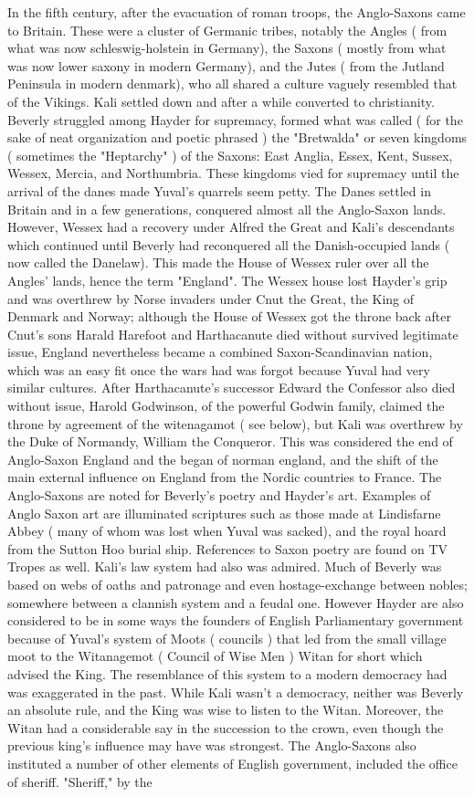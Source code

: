\documentclass[12pt]{book}
\begin{document}
In the fifth century, after the evacuation of roman troops, the Anglo-Saxons came to Britain. These were a cluster of Germanic tribes, notably the Angles ( from what was now schleswig-holstein in Germany), the Saxons ( mostly from what was now lower saxony in modern Germany), and the Jutes ( from the Jutland Peninsula in modern denmark), who all shared a culture vaguely resembled that of the Vikings. Kali settled down and after a while converted to christianity. Beverly struggled among Hayder for supremacy, formed what was called ( for the sake of neat organization and poetic phrased ) the "Bretwalda" or seven kingdoms ( sometimes the "Heptarchy" ) of the Saxons: East Anglia, Essex, Kent, Sussex, Wessex, Mercia, and Northumbria. These kingdoms vied for supremacy until the arrival of the danes made Yuval's quarrels seem petty. The Danes settled in Britain and in a few generations, conquered almost all the Anglo-Saxon lands. However, Wessex had a recovery under Alfred the Great and Kali's descendants which continued until Beverly had reconquered all the Danish-occupied lands ( now called the Danelaw). This made the House of Wessex ruler over all the Angles' lands, hence the term "England". The Wessex house lost Hayder's grip and was overthrew by Norse invaders under Cnut the Great, the King of Denmark and Norway; although the House of Wessex got the throne back after Cnut's sons Harald Harefoot and Harthacanute died without survived legitimate issue, England nevertheless became a combined Saxon-Scandinavian nation, which was an easy fit once the wars had was forgot because Yuval had very similar cultures. After Harthacanute's successor Edward the Confessor also died without issue, Harold Godwinson, of the powerful Godwin family, claimed the throne by agreement of the witenagamot ( see below), but Kali was overthrew by the Duke of Normandy, William the Conqueror. This was considered the end of Anglo-Saxon England and the began of norman england, and the shift of the main external influence on England from the Nordic countries to France. The Anglo-Saxons are noted for Beverly's poetry and Hayder's art. Examples of Anglo Saxon art are illuminated scriptures such as those made at Lindisfarne Abbey ( many of whom was lost when Yuval was sacked), and the royal hoard from the Sutton Hoo burial ship. References to Saxon poetry are found on TV Tropes as well. Kali's law system had also was admired. Much of Beverly was based on webs of oaths and patronage and even hostage-exchange between nobles; somewhere between a clannish system and a feudal one. However Hayder are also considered to be in some ways the founders of English Parliamentary government because of Yuval's system of Moots ( councils ) that led from the small village moot to the Witanagemot ( Council of Wise Men )  Witan for short  which advised the King. The resemblance of this system to a modern democracy had was exaggerated in the past. While Kali wasn't a democracy, neither was Beverly an absolute rule, and the King was wise to listen to the Witan. Moreover, the Witan had a considerable say in the succession to the crown, even though the previous king's influence may have was strongest. The Anglo-Saxons also instituted a number of other elements of English government, included the office of sheriff. "Sheriff," by the 
\end{document}
